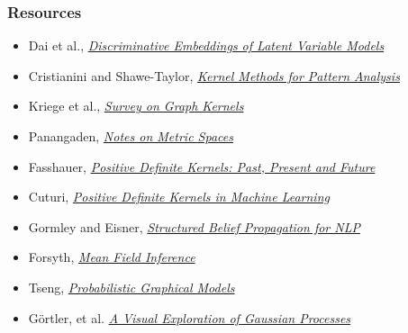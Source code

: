 \documentclass{beamer}
\begin{document}
    \begin{frame}
        \frametitle{Resources}
        \begin{itemize}
            \item Dai et al., \textit{\href{https://arxiv.org/pdf/1603.05629.pdf}{Discriminative Embeddings of Latent Variable Models}}
            \item Cristianini and Shawe-Taylor, \textit{\href{https://people.eecs.berkeley.edu/~jordan/kernels/0521813972c03_p47-84.pdf}{Kernel Methods for Pattern Analysis}}
            \item Kriege et al., \textit{\href{https://arxiv.org/pdf/1903.11835.pdf}{Survey on Graph Kernels}}
            \item Panangaden, \textit{\href{https://www.cs.mcgill.ca/~prakash/Courses/599/Notes/metric_spaces.pdf}{Notes on Metric Spaces}}
            \item Fasshauer, \textit{\href{http://www.math.iit.edu/~fass/PDKernels.pdf}{Positive Definite Kernels: Past, Present and Future}}
            \item Cuturi, \textit{\href{https://marcocuturi.net/Papers/pdk_in_ml.pdf}{Positive Definite Kernels in Machine Learning}}
            \item Gormley and Eisner, \textit{\href{http://www.cs.cmu.edu/~mgormley/bp-tutorial/}{Structured Belief Propagation for NLP}}
            \item Forsyth, \textit{\href{http://luthuli.cs.uiuc.edu/~daf/courses/AutonomousCars/autoencodernotes.pdf}{Mean Field Inference}}
            \item Tseng, \textit{\href{https://frnsys.com/ai_notes/foundations/probabilistic_graphical_models.html}{Probabilistic Graphical Models}}
            \item G\"ortler, et al. \textit{\href{https://distill.pub/2019/visual-exploration-gaussian-processes/}{A Visual Exploration of Gaussian Processes}}
        \end{itemize}
    \end{frame}
\end{document}
